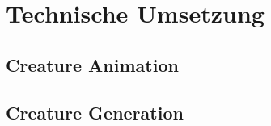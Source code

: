 \chapter{Technische Umsetzung}
\label{Technische_Umsetzung}

\section{Creature Animation}


\section{Creature Generation}
